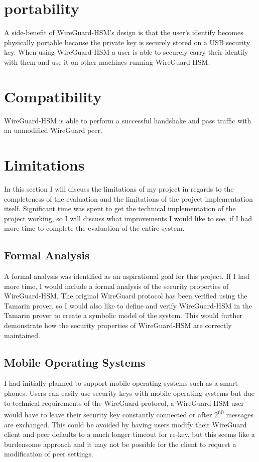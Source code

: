 \documentclass [11pt, proquest] {uwthesis}[2020/02/24]
\begin{document}
\section{portability}
A side-benefit of WireGuard-HSM's design is that the user's identify becomes physically portable because the private key is securely stored on a USB security key. When using WireGuard-HSM a user is able to securely carry their identify with them and use it on other machines running WireGuard-HSM.

\section{Compatibility}
WireGuard-HSM is able to perform a successful handshake and pass traffic with an unmodified WireGuard peer.

\section {Limitations}
In this section I will discuss the limitations of my project in regards to the completeness of the evaluation and the limitations of the project implementation itself. Significant time was spent to get the technical implementation of the project working, so I will discuss what improvements I would like to see, if I had more time to complete the evaluation of the entire system.

\subsection{Formal Analysis}
A formal analysis was identified as an aspirational goal for this project. If I had more time, I would include a formal analysis of the security properties of WireGuard-HSM. The original WireGuard protocol has been verified using the Tamarin prover\cite{donenfeld_formal_2018}, so I would also like to define and verify WireGuard-HSM in the Tamarin prover to create a symbolic model of the system. This would further demonstrate how the security properties of WireGuard-HSM are correctly maintained.

\subsection{Mobile Operating Systems}
I had initially planned to support mobile operating systems such as a smart-phones. Users can easily use security keys with mobile operating systems but due to technical requirements of the WireGuard protocol, a WireGuard-HSM user would have to leave their security key constantly connected
or after 2\textsuperscript{60} messages are exchanged. This could be avoided by having users modify their WireGuard client and peer defaults to a much longer timeout for re-key, but this seems like a burdensome approach and it may not be possible for the client to request a modification of peer settings.
\end{document}
